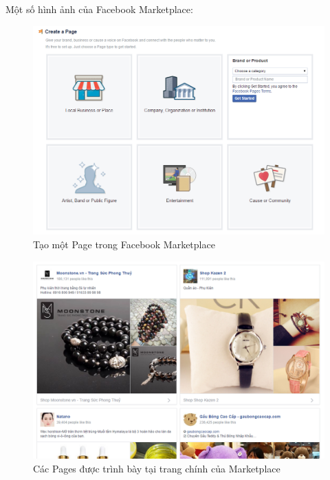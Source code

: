 Một số hình ảnh của Facebook Marketplace:

\begin{figure}[H]
	\centering
	\includegraphics[scale=.5]{img/fb-create-page.PNG} 
	\caption{Tạo một Page trong Facebook Marketplace}
\end{figure}

\begin{figure}[H]
	\centering
	\includegraphics[scale=.5]{img/fb-shop.PNG} 
	\caption{Các Pages được trình bày tại trang chính của Marketplace}
\end{figure}

